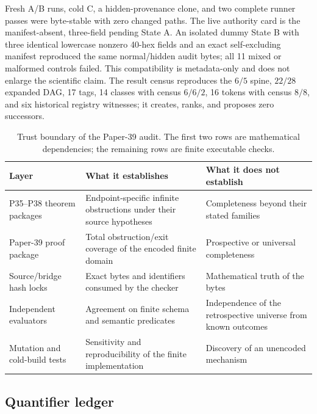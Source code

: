 Fresh A/B runs, cold C, a hidden-provenance clone, and two complete runner
passes were byte-stable with zero changed paths.  The live authority card is
the manifest-absent, three-field pending State A.  An isolated dummy State B
with three identical lowercase nonzero 40-hex fields and an exact
self-excluding manifest reproduced the same normal/hidden audit bytes; all 11
mixed or malformed controls failed.  This compatibility is metadata-only and
does not enlarge the scientific claim.  The result census reproduces the
$6/5$ spine, $22/28$ expanded DAG, 17 tags, 14 classes with census $6/6/2$, 16
tokens with census $8/8$, and six historical registry witnesses; it creates,
ranks, and proposes zero successors.

\begin{table}[H]
\centering
\caption{Trust boundary of the Paper-39 audit.  The first two rows are
mathematical dependencies; the remaining rows are finite executable checks.}
\label{tab:trust}
\footnotesize
\begin{tabularx}{\textwidth}{@{}L{3.0cm}Y L{3.5cm}@{}}
\toprule
Layer & What it establishes & What it does not establish \\
\midrule
P35--P38 theorem packages & Endpoint-specific infinite obstructions under
their source hypotheses & Completeness beyond their stated families \\
Paper-39 proof package & Total obstruction/exit coverage of the encoded finite
domain & Prospective or universal completeness \\
Source/bridge hash locks & Exact bytes and identifiers consumed by the checker
& Mathematical truth of the bytes \\
Independent evaluators & Agreement on finite schema and semantic predicates
& Independence of the retrospective universe from known outcomes \\
Mutation and cold-build tests & Sensitivity and reproducibility of the finite
implementation & Discovery of an unencoded mechanism \\
\bottomrule
\end{tabularx}
\end{table}

\subsection{Quantifier ledger}

